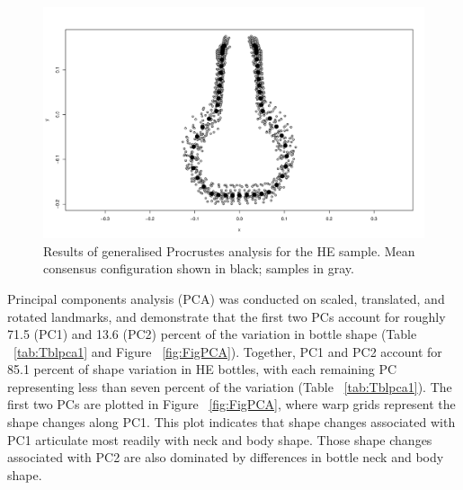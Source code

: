 \documentclass[review]{elsarticle}
\begin{document}
\begin{figure}[ht]\centering
\includegraphics[width=\linewidth]{gpa}
\caption{Results of generalised Procrustes analysis for the HE sample. Mean consensus configuration shown in black; samples in gray.}
\label{fig:FigGPA}
\end{figure}

Principal components analysis (PCA) was conducted on scaled, translated, and rotated landmarks, and demonstrate that the first two PCs account for roughly 71.5 (PC1) and 13.6 (PC2) percent of the variation in bottle shape (Table ~\ref{tab:Tblpca1} and Figure ~\ref{fig:FigPCA}). Together, PC1 and PC2 account for 85.1 percent of shape variation in HE bottles, with each remaining PC representing less than seven percent of the variation (Table ~\ref{tab:Tblpca1}). The first two PCs are plotted in Figure ~\ref{fig:FigPCA}, where warp grids represent the shape changes along PC1. This plot indicates that shape changes associated with PC1 articulate most readily with neck and body shape. Those shape changes associated with PC2 are also dominated by differences in bottle neck and body shape.
\end{document}
